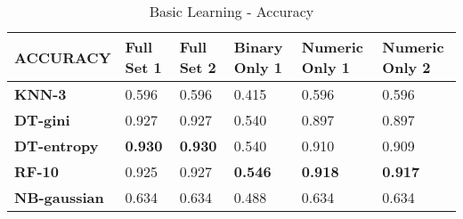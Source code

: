 \documentclass[10pt, conference, compsocconf]{IEEEtran}
\begin{document}
 
\begin{center}
	\begin{table}[ht]
		\centering \footnotesize
		\vspace{-2mm}
		\caption{Basic Learning - Accuracy}
		\hspace{1cm}
		\begin{tabularx}{\linewidth}{ l  X  X  X  X  X }
			\hline
			\textbf{ACCURACY} &	\textbf{Full Set 1}&	\textbf{Full Set 2}&	\textbf{Binary Only 1}&	\textbf{Numeric Only 1}&	\textbf{Numeric Only 2} \\ \hline
			
			
			\textbf{KNN-3}&	0.596&	0.596&	0.415&	0.596&	0.596\\ \hline
			\textbf{DT-gini}&	0.927&	0.927&	0.540&	0.897&	0.897\\ \hline
			\textbf{DT-entropy}&	\textbf{0.930}&	\textbf{0.930}&	0.540&	0.910&	0.909\\ \hline
			\textbf{RF-10}&	0.925&	0.927&	\textbf{0.546}&	\textbf{0.918}&	\textbf{0.917}\\ \hline
			\textbf{NB-gaussian}&	0.634&	0.634&	0.488&	0.634&	0.634\\ \hline
			
			
		\end{tabularx}\newline
		\vspace{-2mm}
		\label{Table1}
	\end{table} \hfil
\end{center}
\end{document}
